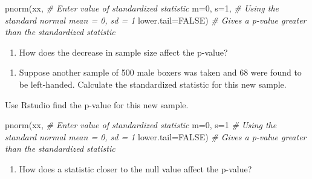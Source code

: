 \documentclass[
]{report}
\newenvironment{Shaded}{\begin{snugshade}}{\end{snugshade}}
\newcommand{\AttributeTok}[1]{\textcolor[rgb]{0.77,0.63,0.00}{#1}}
\newcommand{\CommentTok}[1]{\textcolor[rgb]{0.56,0.35,0.01}{\textit{#1}}}
\newcommand{\ConstantTok}[1]{\textcolor[rgb]{0.00,0.00,0.00}{#1}}
\newcommand{\DecValTok}[1]{\textcolor[rgb]{0.00,0.00,0.81}{#1}}
\newcommand{\FunctionTok}[1]{\textcolor[rgb]{0.00,0.00,0.00}{#1}}
\newcommand{\NormalTok}[1]{#1}
\providecommand{\tightlist}{%
  \setlength{\itemsep}{0pt}\setlength{\parskip}{0pt}}
\begin{document}
\begin{Shaded}
\begin{Highlighting}[]
\FunctionTok{pnorm}\NormalTok{(xx, }\CommentTok{\# Enter value of standardized statistic}
      \AttributeTok{m=}\DecValTok{0}\NormalTok{, }\AttributeTok{s=}\DecValTok{1}\NormalTok{, }\CommentTok{\# Using the standard normal mean = 0, sd = 1}
      \AttributeTok{lower.tail=}\ConstantTok{FALSE}\NormalTok{) }\CommentTok{\# Gives a p{-}value greater than the standardized statistic}
\end{Highlighting}
\end{Shaded}

\begin{enumerate}
\def\labelenumi{\arabic{enumi}.}
\setcounter{enumi}{16}
\tightlist
\item
  How does the decrease in sample size affect the p-value?
\end{enumerate}

\vspace{0.3in}

\begin{enumerate}
\def\labelenumi{\arabic{enumi}.}
\setcounter{enumi}{17}
\tightlist
\item
  Suppose another sample of 500 male boxers was taken and 68 were found to be left-handed. Calculate the standardized statistic for this new sample.
\end{enumerate}

\vspace{1in}

Use Rstudio find the p-value for this new sample.

\begin{Shaded}
\begin{Highlighting}[]
\FunctionTok{pnorm}\NormalTok{(xx, }\CommentTok{\# Enter value of standardized statistic}
      \AttributeTok{m=}\DecValTok{0}\NormalTok{, }\AttributeTok{s=}\DecValTok{1} \CommentTok{\# Using the standard normal mean = 0, sd = 1}
      \AttributeTok{lower.tail=}\ConstantTok{FALSE}\NormalTok{) }\CommentTok{\# Gives a p{-}value greater than the standardized statistic}
\end{Highlighting}
\end{Shaded}

\begin{enumerate}
\def\labelenumi{\arabic{enumi}.}
\setcounter{enumi}{18}
\tightlist
\item
  How does a statistic closer to the null value affect the p-value?
\end{enumerate}
\end{document}
